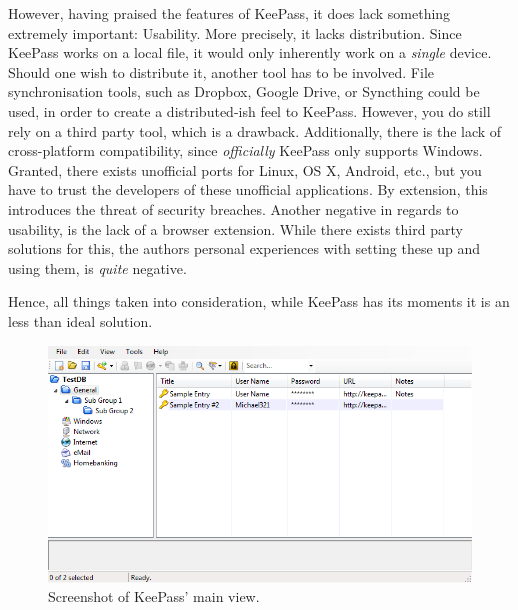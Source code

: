 			However, having praised the features of KeePass, it does lack something extremely important: Usability. More precisely, it lacks distribution. Since KeePass works on a local file, it would only inherently work on a \emph{single} device. Should one wish to distribute it, another tool has to be involved. File synchronisation tools, such as Dropbox, Google Drive, or Syncthing could be used, in order to create a distributed-ish feel to KeePass. However, you do still rely on a third party tool, which is a drawback. Additionally, there is the lack of cross-platform compatibility, since \emph{officially} KeePass only supports Windows. Granted, there exists unofficial ports for Linux, OS X, Android, etc., but you have to trust the developers of these unofficial applications. By extension, this introduces the threat of security breaches. Another negative in regards to usability, is the lack of a browser extension. While there exists third party solutions for this, the authors personal experiences with setting these up and using them, is \emph{quite} negative.	

			Hence, all things taken into consideration, while KeePass has its moments it is an less than ideal solution.

			
			\begin{figure}[h!]
				\centering
				\includegraphics[width=\textwidth]{figures/analysis/keepass_mainview.png}
				\caption{Screenshot of KeePass' main view.}
				\label{fig:keepass_main}
			\end{figure}


